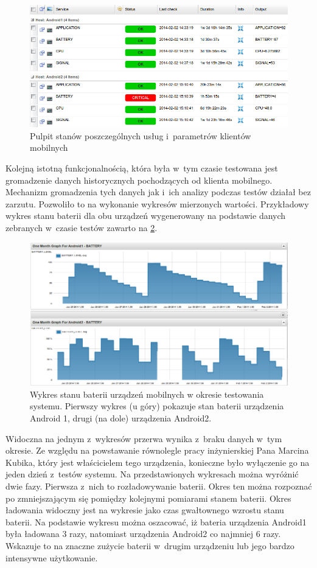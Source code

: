 \begin{figure}[ht]
  \caption{Pulpit stanów poszczególnych usług i~parametrów klientów
    mobilnych}
  \label{fig:criticalBat}
  \centering
\includegraphics[width=1\textwidth]{img/criticalBat.png}
\end{figure}

Kolejną istotną funkcjonalnością, która była w~tym czasie testowana
jest gromadzenie danych historycznych pochodzących od klienta
mobilnego. Mechanizm gromadzenia tych danych jak i~ich analizy podczas
testów działał bez zarzutu. Pozwoliło to na wykonanie wykresów
mierzonych wartości. Przykładowy wykres stanu baterii dla obu urządzeń
wygenerowany na podstawie danych zebranych w~czasie testów zawarto na
\ref{fig:baterie}.
 
\begin{figure}[ht]
  \caption{Wykres stanu baterii urządzeń mobilnych w okresie
    testowania systemu. Pierwszy wykres (u góry) pokazuje stan baterii
    urządzenia Android 1, drugi (na dole) urządzenia Android2.}
  \label{fig:baterie}
  \centering
\includegraphics[width=1\textwidth]{img/battery.png}
\end{figure}

Widoczna na jednym z~wykresów przerwa wynika z~braku danych w~tym
okresie. Ze względu na powstawanie równolegle pracy inżynierskiej Pana
Marcina Kubika, który jest właścicielem tego urządzenia, konieczne było
wyłączenie go na jeden dzień z~testów systemu. Na przedstawionych
wykresach można wyróżnić dwie fazy. Pierwsza z~nich to rozładowywanie
baterii. Okres ten można rozpoznać po zmniejszającym się pomiędzy
kolejnymi pomiarami stanem baterii. Okres ładowania widoczny jest na
wykresie jako czas gwałtownego wzrostu stanu baterii. Na podstawie
wykresu można oszacować, iż bateria urządzenia Android1 była ładowana
3 razy, natomiast urządzenia Android2 co najmniej 6 razy. Wskazuje to
na znaczne zużycie baterii w~drugim urządzeniu lub jego bardzo
intensywne użytkowanie.

